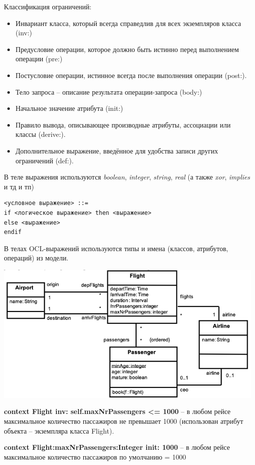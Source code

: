 Классификация ограничений:
\begin{itemize}
    \item Инвариант класса, который всегда справедлив для всех экземпляров класса (inv:)
    \item Предусловие операции, которое должно быть истинно перед выполнением операции (pre:)
    \item Постусловие операции, истинное всегда после выполнения операции (post:).
    \item Тело запроса – описание результата операции-запроса (body:)
    \item Начальное значение атрибута (init:)
    \item Правило вывода, описывающее производные атрибуты, ассоциации или классы (derive:).
    \item Дополнительное выражение, введённое для удобства записи других ограничений (def:).
\end{itemize}

В теле выражения используются \textit{boolean}, \textit{integer}, \textit{string}, \textit{real} (а также \textit{xor}, \textit{implies} и тд и тп)

\begin{verbatim}
<условное выражение> ::=
if <логическое выражение> then <выражение>
else <выражение>
endif    
\end{verbatim}

В телах OCL-выражений используются типы и имена (классов, атрибутов, операций) из модели.

\includegraphics[scale=0.37]{pics/ocl.png}

\textbf{context Flight inv: self.maxNrPassengers <= 1000}   – в любом рейсе максимальное количество пассажиров не превышает 1000 (использован атрибут объекта – экземпляра класса Flight).

\textbf{context Flight:maxNrPassengers:Integer init: 1000} – в любом рейсе максимальное количество
пассажиров по умолчанию = 1000

